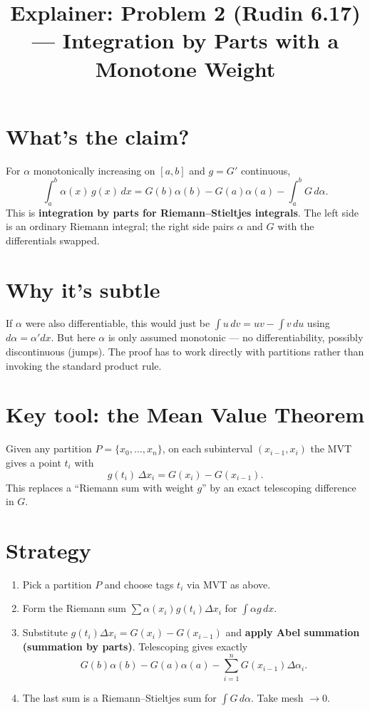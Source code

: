 \documentclass[12pt]{article}
\title{Explainer: Problem 2 (Rudin 6.17) --- Integration by Parts with a Monotone Weight}
\author{}
\date{}
\begin{document}
\maketitle

\section*{What's the claim?}
For $\alpha$ monotonically increasing on $[a,b]$ and $g = G'$ continuous,
$$
\int_a^b \alpha(x)\, g(x)\, dx = G(b)\alpha(b) - G(a)\alpha(a) - \int_a^b G\, d\alpha.
$$
This is \textbf{integration by parts for Riemann--Stieltjes integrals}. The left side is an ordinary Riemann integral; the right side pairs $\alpha$ and $G$ with the differentials swapped.

\section*{Why it's subtle}
If $\alpha$ were also differentiable, this would just be $\int u\, dv = uv - \int v\, du$ using $d\alpha = \alpha' dx$. But here $\alpha$ is only assumed monotonic --- no differentiability, possibly discontinuous (jumps). The proof has to work directly with partitions rather than invoking the standard product rule.

\section*{Key tool: the Mean Value Theorem}
Given any partition $P = \{x_0, \ldots, x_n\}$, on each subinterval $(x_{i-1}, x_i)$ the MVT gives a point $t_i$ with
$$
g(t_i)\, \Delta x_i = G(x_i) - G(x_{i-1}).
$$
This replaces a ``Riemann sum with weight $g$'' by an exact telescoping difference in $G$.

\section*{Strategy}
\begin{enumerate}
  \item Pick a partition $P$ and choose tags $t_i$ via MVT as above.
  \item Form the Riemann sum $\sum \alpha(x_i) g(t_i) \Delta x_i$ for $\int \alpha g\, dx$.
  \item Substitute $g(t_i)\Delta x_i = G(x_i) - G(x_{i-1})$ and \textbf{apply Abel summation (summation by parts)}. Telescoping gives exactly
  $$
  G(b)\alpha(b) - G(a)\alpha(a) - \sum_{i=1}^n G(x_{i-1}) \Delta \alpha_i.
  $$
  \item The last sum is a Riemann--Stieltjes sum for $\int G\, d\alpha$. Take mesh $\to 0$.
\end{enumerate}
\end{document}
